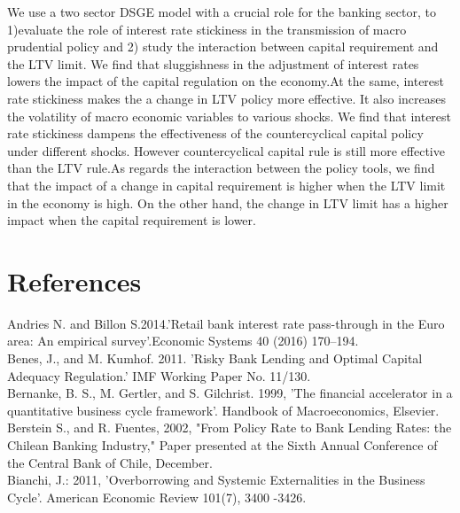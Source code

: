 \documentclass[12pt]{article}
\numberwithin{equation}{section}
\begin{document}
We use a two sector DSGE model with a crucial role for the banking sector,  to 1)evaluate the role of interest rate stickiness in the transmission of macro prudential policy and 2) study the interaction between capital requirement and the LTV limit. We find that sluggishness in the adjustment of interest rates lowers the impact of the capital regulation on the economy.At the same, interest rate stickiness makes the a change in LTV policy more effective. It also increases the volatility of macro economic variables to various shocks. We find that interest rate stickiness dampens the effectiveness of the countercyclical capital policy under different shocks. However countercyclical capital rule is still more effective than the LTV rule.As regards the interaction between the policy tools, we find that the impact of a change in capital requirement is higher when the LTV limit in the economy is high. On the other hand, the change in LTV limit has a higher impact when the capital requirement is lower.















\section{References}

\hspace*{0.6cm}Andries N. and Billon S.2014.'Retail bank interest rate pass-through in the Euro area: An empirical survey'.Economic Systems 40 (2016) 170–194.\\

Benes, J., and M. Kumhof. 2011. 'Risky Bank Lending and Optimal
Capital Adequacy Regulation.' IMF Working Paper No. 11/130.\\


Bernanke, B. S., M. Gertler, and S. Gilchrist. 1999, 'The financial accelerator in a quantitative business cycle framework'. Handbook of Macroeconomics, Elsevier.\\

Berstein S., and R. Fuentes, 2002, "From Policy Rate to Bank Lending Rates: the Chilean Banking Industry," Paper presented at the Sixth Annual Conference of the Central Bank of Chile, December.\\

Bianchi, J.: 2011, 'Overborrowing and Systemic Externalities in the Business Cycle'.
American Economic Review 101(7), 3400 -3426.\\
\end{document}
